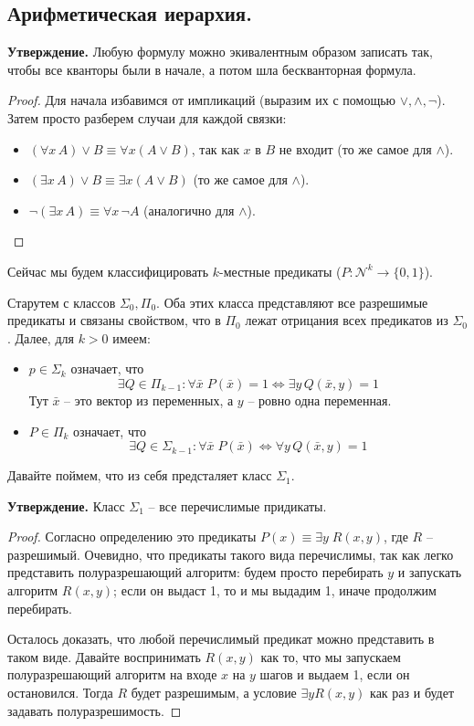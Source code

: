 \subsection{Арифметическая иерархия.}
\textbf{Утверждение.} Любую формулу можно экивалентным образом записать так, чтобы все кванторы были в начале, а потом шла бескванторная формула.
\begin{proof}
   Для начала избавимся от импликаций (выразим их с помощью $\lor, \land, \lnot$). Затем просто разберем случаи для каждой связки: \begin{itemize}
        \item $(\forall x \, A) \lor B \equiv \forall x (A \lor B)$, так как $x$ в $B$ не входит (то же самое для $\land$).
        \item  $(\exists x \, A) \lor B \equiv \exists x (A \lor B)$ (то же самое для $\land$).
        \item $\lnot (\exists x  \, A) \equiv \forall x \, \lnot A$ (аналогично для $\land$).
    \end{itemize}
\end{proof} 

Сейчас мы будем классифицировать $k$-местные предикаты ($P: \mathcal{N}^k \to \{ 0, 1 \}$). 

Старутем с классов $\Sigma_0, \Pi_0$. Оба этих класса представляют все разрешимые предикаты и связаны свойством, что в $\Pi_0$ лежат отрицания всех предикатов из $\Sigma_0$. Далее, для $k > 0$ имеем: \begin{itemize}
    \item $p \in \Sigma_k$ означает, что \[\exists Q \in \Pi_{k - 1} : \forall \bar{x} \; P(\bar{x}) = 1 \Leftrightarrow \exists y \, Q(\bar{x}, y) = 1 \]
    Тут $\bar{x}$ -- это вектор из переменных, а $y$ -- ровно одна переменная.
    \item $P \in \Pi_k$ означает, что \[ \exists Q \in \Sigma_{k - 1} : \forall \bar{x} \; P(\bar{x}) \Leftrightarrow \forall y \, Q(\bar{x}, y) = 1  \]
\end{itemize}

Давайте поймем, что из себя предсталяет класс $\Sigma_1$. 

\textbf{Утверждение.} Класс $\Sigma_1$ -- все перечислимые придикаты.

\begin{proof}
    Согласно определению это предикаты $P(x) \equiv \exists y \; R(x, y)$, где $R$ -- разрешимый. Очевидно, что предикаты такого вида перечислимы, так как легко представить полуразрешающий алгоритм: будем просто перебирать $y$ и запускать алгоритм $R(x, y)$; если он выдаст 1, то и мы выдадим 1, иначе продолжим перебирать. 
    
    Осталось доказать, что любой перечислимый предикат можно представить в таком виде. Давайте воспринимать $R(x, y)$ как то, что мы запускаем полуразрешающий алгоритм на входе $x$ на $y$ шагов и выдаем 1, если он остановился. Тогда $R$ будет разрешимым, а условие $\exists y R(x, y)$ как раз и будет задавать полуразрешимость.  
\end{proof}

